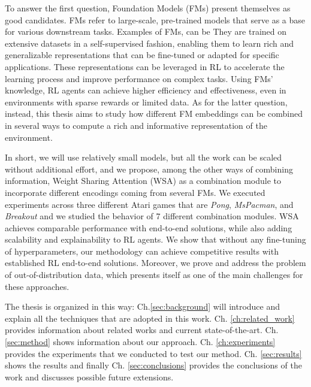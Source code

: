 To answer the first question, Foundation Models (FMs) present themselves as good candidates.
FMs refer to large-scale, pre-trained models that serve as a base for various downstream tasks.
Examples of FMs, can be \citet{brown2020language, devlin2018bert, he2016deep}
They are trained on extensive datasets in a self-supervised fashion, enabling them to learn rich and generalizable representations that can be fine-tuned or adapted for specific applications. 
These representations can be leveraged in RL to accelerate the learning process and improve performance on complex tasks. Using FMs' knowledge, RL agents can achieve higher efficiency and effectiveness, even in environments with sparse rewards or limited data. 
As for the latter question, instead, this thesis aims to study how different FM embeddings can be combined in several ways to compute a rich and informative representation of the environment. 


In short, we will use relatively small models, but all the work can be scaled without additional effort, and we propose, among the other ways of combining information, Weight Sharing Attention (WSA) as a combination module to incorporate different encodings coming from several FMs.
We executed experiments across three different Atari games that are \textit{Pong}, \textit{MsPacman}, and \textit{Breakout} and we studied the behavior of 7 different combination modules.
WSA achieves comparable performance with end-to-end solutions, while also adding scalability and explainability to RL agents.
We show that without any fine-tuning of hyperparameters, our methodology can achieve competitive results with established RL end-to-end solutions. Moreover, we prove and address the problem of out-of-distribution data, which presents itself as one of the main challenges for these approaches. 


The thesis is organized in this way: Ch.\ref{sec:background} will introduce and explain all the techniques that are adopted in this work. Ch. \ref{ch:related_work} provides information about related works and current state-of-the-art. Ch. \ref{sec:method} shows information about our approach. Ch. \ref{ch:experiments} provides the experiments that we conducted to test our method. Ch. \ref{sec:results} shows the results and finally Ch. \ref{sec:conclusions} provides the conclusions of the work and discusses possible future extensions.
